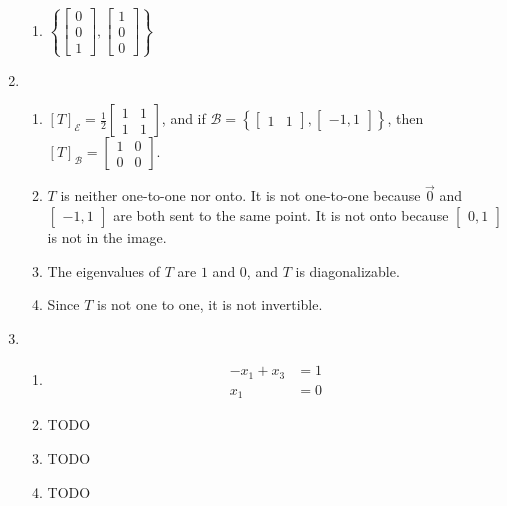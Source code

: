 \documentclass[red]{tutorial}
\newcommand{\mat}[1]{\begin{bmatrix} #1 %
\end{bmatrix}}
\theoremstyle{definition}
\theoremstyle{theorem}
\begin{document}
\begin{solutions}
\begin{enumerate}
\begin{enumerate}
        \item $\left\{\mat{0\\0\\1} , \mat{1\\0\\0}\right\}$
      \end{enumerate}
    \item
      \begin{enumerate}
        \item $[T]_{\mathcal{E}} = \frac12\mat{1&1\\1&1}$, and 
          if $\mathcal{B} = \left\{\mat{1&1},\mat{-1,1}\right\}$, then 
          $[T]_{\mathcal{B}} = \mat{1&0\\0&0}$.
        \item $T$ is neither one-to-one nor onto. It is not 
          one-to-one because $\vec 0$ and $\mat{-1,1}$ are both sent 
          to the same point. It is not onto because $\mat{0,1}$ is not 
          in the image.
        \item The eigenvalues of $T$ are $1$ and $0$, 
          and $T$ is diagonalizable.
        \item Since $T$ is not one to one, it is not invertible.
      \end{enumerate}
    \item
      \begin{enumerate}
        \item
          \begin{align*}
            -x_1 + x_3 &= 1\\
            x_1 &= 0
          \end{align*}
        \item TODO
        \item TODO
        \item TODO
      \end{enumerate}
  \end{enumerate}
\end{solutions}
\end{document}
